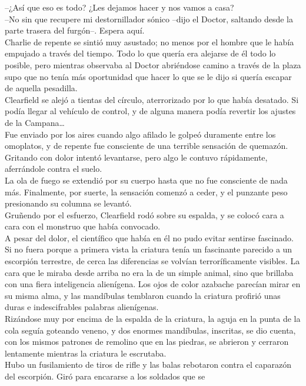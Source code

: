 --¿Así que eso es todo? ¿Les dejamos hacer y nos vamos a casa?\\
--No sin que recupere mi destornillador sónico --dijo el Doctor,
saltando desde la parte trasera del furgón--. Espera aquí.\\
Charlie de repente se sintió muy asustado; no menos por el hombre que le
había empujado a través del tiempo. Todo lo que quería era alejarse de
él todo lo posible, pero mientras observaba al Doctor abriéndose camino
a través de la plaza supo que no tenía más oportunidad que hacer lo que
se le dijo si quería escapar de aquella
pesadilla.\\[2\baselineskip]Clearfield se alejó a tientas del círculo,
aterrorizado por lo que había desatado. Si podía llegar al vehículo de
control, y de alguna manera podía revertir los ajustes de la
Campana\ldots{}\\
Fue enviado por los aires cuando algo afilado le golpeó duramente entre
los omoplatos, y de repente fue consciente de una terrible sensación de
quemazón. Gritando con dolor intentó levantarse, pero algo le contuvo
rápidamente, aferrándole contra el suelo.\\
La ola de fuego se extendió por su cuerpo hasta que no fue consciente de
nada más. Finalmente, por suerte, la sensación comenzó a ceder, y el
punzante peso presionando su columna se levantó.\\
Gruñendo por el esfuerzo, Clearfield rodó sobre su espalda, y se colocó
cara a cara con el monstruo que había convocado.\\
A pesar del dolor, el científico que había en él no pudo evitar sentirse
fascinado. Si no fuera porque a primera vista la criatura tenía un
fascinante parecido a un escorpión terrestre, de cerca las diferencias
se volvían terroríficamente visibles. La cara que le miraba desde arriba
no era la de un simple animal, sino que brillaba con una fiera
inteligencia alienígena. Los ojos de color azabache parecían mirar en su
misma alma, y las mandíbulas temblaron cuando la criatura profirió unas
duras e indescifrables palabras alienígenas.\\
Rizándose muy por encima de la espalda de la criatura, la aguja en la
punta de la cola seguía goteando veneno, y dos enormes mandíbulas,
inscritas, se dio cuenta, con los mismos patrones de remolino que en las
piedras, se abrieron y cerraron lentamente mientras la criatura le
escrutaba.\\
Hubo un fusilamiento de tiros de rifle y las balas rebotaron contra el
caparazón del escorpión. Giró para encararse a los soldados que se
